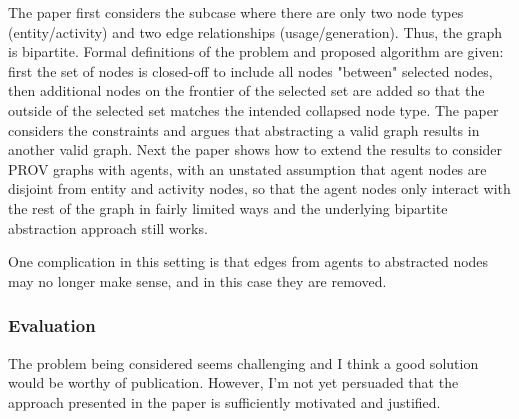 \documentclass{article}
\newcommand{\showComments}{yes} %
\newcommand{\com}[2]{\ifthenelse{\equal{\showComments}{yes}}{\textcolor{#1}{#2}}{}}
\newcommand{\comment}[1]{\com{red}{#1}}
\begin{document}
The paper first considers the subcase where there are only two node types (entity/activity) and two edge relationships (usage/generation). Thus, the graph is bipartite.  Formal definitions of the problem and proposed algorithm are given: first the set of nodes is closed-off to include all nodes "between" selected nodes, then additional nodes on the frontier of the selected set are added so that the outside of the selected set matches the intended collapsed node type.  The paper considers the constraints and argues that abstracting a valid graph results in another valid graph.  Next the paper shows how to extend the results to consider PROV graphs with agents, with an unstated assumption that agent nodes are disjoint from entity and activity nodes, so that the agent nodes only interact with the rest of the graph in fairly limited ways and the underlying bipartite abstraction approach still works.

\comment{is this assumption not always true? PM to clarify.}

One complication in this setting is that edges from agents to abstracted nodes may no longer make sense, and in this case they are removed.

\subsubsection*{Evaluation}

The problem being considered seems challenging and I think a good solution would be worthy of publication.  However, I'm not yet persuaded that the approach presented in the paper is sufficiently motivated and justified.  
\end{document}
